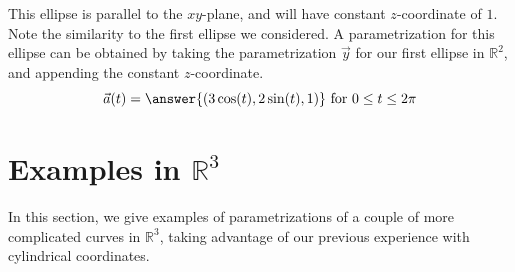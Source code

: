 \documentclass{ximera}
\begin{document}
\begin{example}
This ellipse is parallel to the $xy$-plane, and will have constant $z$-coordinate of $1$. Note the similarity to the first ellipse we considered. A parametrization for this ellipse can be obtained by taking the parametrization $\vec{y}$ for our first ellipse in $\mathbb{R}^2$, and appending the constant $z$-coordinate.
\[
\vec{a}(t) = \answer{(3\cos(t), 2\sin(t),1)}\textrm{ for }0\leq t\leq 2\pi
\]
\end{example}

\section*{Examples in $\mathbb{R}^3$}

In this section, we give examples of parametrizations of a couple of more complicated curves in $\mathbb{R}^3$, taking advantage of our previous experience with cylindrical coordinates.
\end{document}
